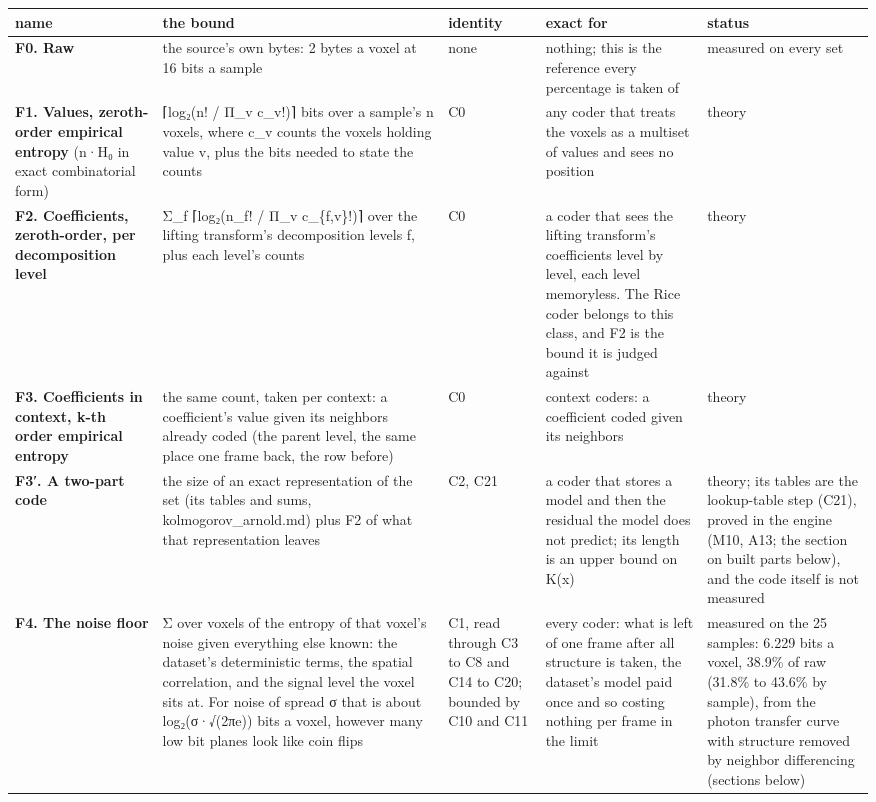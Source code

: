 {\footnotesize
\setlength{\tabcolsep}{6pt}
\begin{longtable}{>{\RaggedRight\arraybackslash}p{}>{\RaggedRight\arraybackslash}p{}>{\RaggedRight\arraybackslash}p{}>{\RaggedRight\arraybackslash}p{}>{\RaggedRight\arraybackslash}p{}}
\toprule
name & the bound & identity & exact for & status \\
\midrule
\endhead
\textbf{F0. Raw} & the source's own bytes: 2 bytes a voxel at 16 bits a sample & none & nothing; this is the reference every percentage is taken of & measured on every set \\
\textbf{F1. Values, zeroth-order empirical entropy} (n·H₀ in exact combinatorial form) & ⌈log₂(n! / Π\_\allowbreak{}v c\_\allowbreak{}v!)⌉ bits over a sample's n voxels, where c\_\allowbreak{}v counts the voxels holding value v, plus the bits needed to state the counts & C0 & any coder that treats the voxels as a multiset of values and sees no position & theory \\
\textbf{F2. Coefficients, zeroth-order, per decomposition level} & Σ\_\allowbreak{}f ⌈log₂(n\_\allowbreak{}f! / Π\_\allowbreak{}v c\_\allowbreak{}\{f,v\}!)⌉ over the lifting transform's decomposition levels f, plus each level's counts & C0 & a coder that sees the lifting transform's coefficients level by level, each level memoryless. The Rice coder belongs to this class, and F2 is the bound it is judged against & theory \\
\textbf{F3. Coefficients in context, k-th order empirical entropy} & the same count, taken per context: a coefficient's value given its neighbors already coded (the parent level, the same place one frame back, the row before) & C0 & context coders: a coefficient coded given its neighbors & theory \\
\textbf{F3′. A two-part code} & the size of an exact representation of the set (its tables and sums, kolmogorov\_\allowbreak{}arnold.md) plus F2 of what that representation leaves & C2, C21 & a coder that stores a model and then the residual the model does not predict; its length is an upper bound on K(x) & theory; its tables are the lookup-table step (C21), proved in the engine (M10, A13; the section on built parts below), and the code itself is not measured \\
\textbf{F4. The noise floor} & Σ over voxels of the entropy of that voxel's noise given everything else known: the dataset's deterministic terms, the spatial correlation, and the signal level the voxel sits at. For noise of spread σ that is about log₂(σ·√(2πe)) bits a voxel, however many low bit planes look like coin flips & C1, read through C3 to C8 and C14 to C20; bounded by C10 and C11 & every coder: what is left of one frame after all structure is taken, the dataset's model paid once and so costing nothing per frame in the limit & measured on the 25 samples: 6.229 bits a voxel, 38.9\% of raw (31.8\% to 43.6\% by sample), from the photon transfer curve with structure removed by neighbor differencing (sections below) \\

\end{longtable}}
